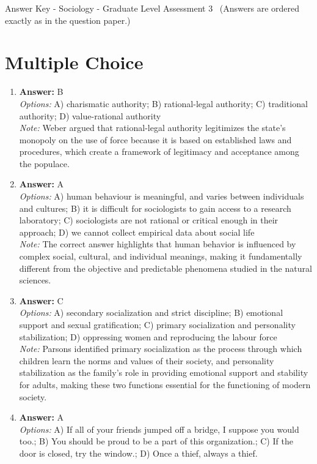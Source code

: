 \documentclass[12pt]{article}
\begin{document}
\begin{center}
Answer Key - Sociology - Graduate Level Assessment 3 \
\small (Answers are ordered exactly as in the question paper.)
\end{center}

\section*{Multiple Choice}
\begin{enumerate}[label=\arabic*.]
\item \textbf{Answer:} B
\\ \textit{Options:} A) charismatic authority; B) rational-legal authority; C) traditional authority; D) value-rational authority
\\ \textit{Note:} Weber argued that rational-legal authority legitimizes the state's monopoly on the use of force because it is based on established laws and procedures, which create a framework of legitimacy and acceptance among the populace.
\item \textbf{Answer:} A
\\ \textit{Options:} A) human behaviour is meaningful, and varies between individuals and cultures; B) it is difficult for sociologists to gain access to a research laboratory; C) sociologists are not rational or critical enough in their approach; D) we cannot collect empirical data about social life
\\ \textit{Note:} The correct answer highlights that human behavior is influenced by complex social, cultural, and individual meanings, making it fundamentally different from the objective and predictable phenomena studied in the natural sciences.
\item \textbf{Answer:} C
\\ \textit{Options:} A) secondary socialization and strict discipline; B) emotional support and sexual gratification; C) primary socialization and personality stabilization; D) oppressing women and reproducing the labour force
\\ \textit{Note:} Parsons identified primary socialization as the process through which children learn the norms and values of their society, and personality stabilization as the family's role in providing emotional support and stability for adults, making these two functions essential for the functioning of modern society.
\item \textbf{Answer:} A
\\ \textit{Options:} A) If all of your friends jumped off a bridge, I suppose you would too.; B) You should be proud to be a part of this organization.; C) If the door is closed, try the window.; D) Once a thief, always a thief.

\end{enumerate}
\end{document}
